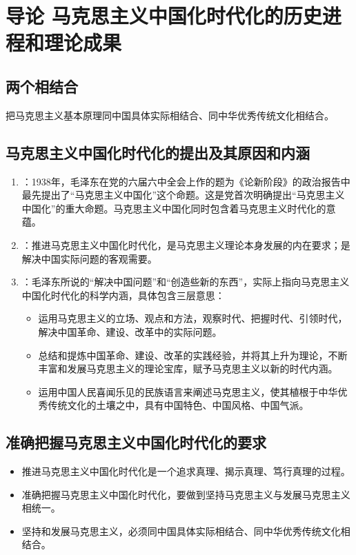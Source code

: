 \noparindent
\section{导论 马克思主义中国化时代化的历史进程和理论成果}
\vspace{1em}

\subsection{两个相结合}
把马克思主义基本原理同中国具体实际相结合、同中华优秀传统文化相结合。

\vspace{1em}
\subsection{马克思主义中国化时代化的提出及其原因和内涵}
\begin{enumerate}
    \item {}：1938年，毛泽东在党的六届六中全会上作的题为《论新阶段》的政治报告中最先提出了“马克思主义中国化”这个命题。这是党首次明确提出“马克思主义中国化”的重大命题。马克思主义中国化同时包含着马克思主义时代化的意蕴。

    \item {}：推进马克思主义中国化时代化，是马克思主义理论本身发展的内在要求；是解决中国实际问题的客观需要。

    \item {}：毛泽东所说的“解决中国问题”和“创造些新的东西”，实际上指向马克思主义中国化时代化的科学内涵，具体包含三层意思：
    \begin{itemize}
        \item 运用马克思主义的立场、观点和方法，观察时代、把握时代、引领时代，解决中国革命、建设、改革中的实际问题。
        \item 总结和提炼中国革命、建设、改革的实践经验，并将其上升为理论，不断丰富和发展马克思主义的理论宝库，赋予马克思主义以新的时代内涵。
        \item 运用中国人民喜闻乐见的民族语言来阐述马克思主义，使其植根于中华优秀传统文化的土壤之中，具有中国特色、中国风格、中国气派。
    \end{itemize}
\end{enumerate}

\vspace{1em}
\subsection{准确把握马克思主义中国化时代化的要求}
\begin{itemize}
    \item 推进马克思主义中国化时代化是一个追求真理、揭示真理、笃行真理的过程。
    \item 准确把握马克思主义中国化时代化，要做到坚持马克思主义与发展马克思主义相统一。
    \item 坚持和发展马克思主义，必须同中国具体实际相结合、同中华优秀传统文化相结合。
\end{itemize}

